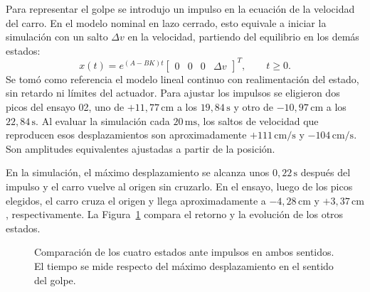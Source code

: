 \documentclass[a4paper, twoside, 10pt, spanish]{article}
\numberwithin{table}{section}
\begin{document}
Para representar el golpe se introdujo un impulso en la ecuación de la velocidad del carro. En el modelo nominal en lazo cerrado, esto equivale a iniciar la simulación con un salto $\Delta v$ en la velocidad, partiendo del equilibrio en los demás estados:
\begin{equation}
    x(t) = e^{(A-BK)t}\begin{bmatrix}0 & 0 & 0 & \Delta v\end{bmatrix}^{T},
    \qquad t \geq 0.
\end{equation}
Se tomó como referencia el modelo lineal continuo con realimentación del estado, sin retardo ni límites del actuador. Para ajustar los impulsos se eligieron dos picos del ensayo 02, uno de $+11{,}77\,\mathrm{cm}$ a los $19{,}84\,\mathrm{s}$ y otro de $-10{,}97\,\mathrm{cm}$ a los $22{,}84\,\mathrm{s}$. Al evaluar la simulación cada $20\,\mathrm{ms}$, los saltos de velocidad que reproducen esos desplazamientos son aproximadamente $+111\,\mathrm{cm/s}$ y $-104\,\mathrm{cm/s}$. Son amplitudes equivalentes ajustadas a partir de la posición.

En la simulación, el máximo desplazamiento se alcanza unos $0{,}22\,\mathrm{s}$ después del impulso y el carro vuelve al origen sin cruzarlo. En el ensayo, luego de los picos elegidos, el carro cruza el origen y llega aproximadamente a $-4{,}28\,\mathrm{cm}$ y $+3{,}37\,\mathrm{cm}$, respectivamente. La Figura~\ref{fig:regulacion-sin-referencia-simulacion} compara el retorno y la evolución de los otros estados.

\begin{figure}[htbp]
    \centering
    \caption{Comparación de los cuatro estados ante impulsos en ambos sentidos. El tiempo se mide respecto del máximo desplazamiento en el sentido del golpe.}
    \label{fig:regulacion-sin-referencia-simulacion}
\end{figure}
\end{document}
